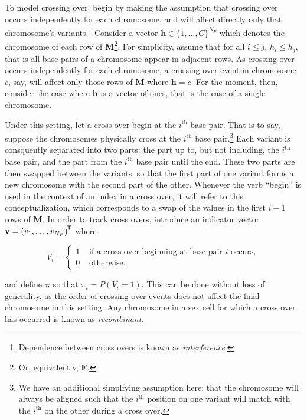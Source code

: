 \documentclass{article}
\newcommand{\ve}[1]{\mathbf{#1}}           %
\newcommand{\sv}[1]{\boldsymbol{#1}}   %
\newcommand{\m}[1]{\mathbf{#1}}               %
\newcommand{\tr}[1]{{#1}^{\mkern-1.5mu\mathsf{T}}}              %
\begin{document}
To model crossing over, begin by making the assumption that crossing over occurs independently for each chromosome, and will affect directly only that chromosome's variants.\footnote{Dependence between cross overs is known as \textit{interference}.} Consider a vector $\ve{h} \in \{1, \dots, C\}^{N_P}$ which denotes the chromosome of each row of $\m{M}$\footnote{Or, equivalently, $\m{F}$.}. For simplicity, assume that for all $i \leq j$, $h_i \leq h_j$, that is all base pairs of a chromosome appear in adjacent rows. As crossing over occurs independently for each chromosome, a crossing over event in chromosome $c$, say, will affect only those rows of $\m{M}$ where $\ve{h} = c$. For the moment, then, consider the case where $\ve{h}$ is a vector of ones, that is the case of a single chromosome.

Under this setting, let a cross over begin at the $i^{\text{th}}$ base pair. That is to say, suppose the chromosomes physically cross at the $i^{\text{th}}$ base pair.\footnote{We have an additional simplfying assumption here: that the chromosome will always be aligned such that the $i^{\text{th}}$ position on one variant will match with the $i^{\text{th}}$ on the other during a cross over.} Each variant is consquently separated into two parts: the part up to, but not including, the $i^{\text{th}}$ base pair, and the part from the $i^{\text{th}}$ base pair until the end. These two parts are then swapped between the variants, so that the first part of one variant forms a new chromosome with the second part of the other. Whenever the verb ``begin'' is used in the context of an index in a cross over, it will refer to this conceptualization, which corresponds to a swap of the values in the first $i-1$ rows of $\m{M}$. In order to track cross overs, introduce an indicator vector $\ve{v} = \tr{(v_1, \dots, v_{N_P})}$ where

\begin{equation} \label{eq:crossindicator}
V_i = \begin{cases}
  1 & \text{ if a cross over beginning at base pair } i \text{ occurs}, \\
  0 & \text{ otherwise},
\end{cases}
\end{equation}

\noindent and define $\sv{\pi}$ so that $\pi_i = P(V_i = 1)$. This can be done without loss of generality, as the order of crossing over events does not affect the final chromosome in this setting. Any chromosome in a sex cell for which a cross over has occurred is known as \textit{recombinant}.
\end{document}
